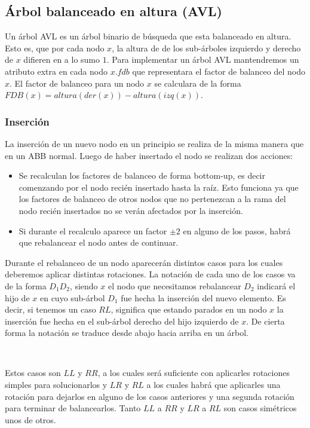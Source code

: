 \documentclass[10pt, a4paper]{report}
\begin{document}
\subsection{\'Arbol balanceado en altura (AVL)}

Un \'arbol AVL es un \'arbol binario de b\'usqueda que esta balanceado en altura. Esto es, que por cada nodo $x$, la altura de de los sub-\'arboles izquierdo y derecho de $x$ difieren en a lo sumo $1$. Para implementar un \'arbol AVL mantendremos un atributo extra en cada nodo $x.fdb$ que representara el factor de balanceo del nodo $x$. El factor de balanceo para un nodo $x$ se calculara de la forma $FDB(x) = altura(der(x)) - altura(izq(x))$.

\subsubsection{Inserci\'on}

La inserci\'on de un nuevo nodo en un principio se realiza de la misma manera que en un ABB normal. Luego de haber insertado el nodo se realizan dos acciones:

\begin{itemize}
 \item Se recalculan los factores de balanceo de forma bottom-up, es decir comenzando por el nodo reci\'en insertado hasta la ra\'iz. Esto funciona ya que los factores de balanceo de otros nodos que no pertenezcan a la rama del nodo reci\'en insertados no se ver\'an afectados por la inserci\'on.
 \item Si durante el recalculo aparece un factor $\pm 2$ en alguno de los pasos, habr\'a que rebalancear el nodo antes de continuar.
\end{itemize}

Durante el rebalanceo de un nodo aparecer\'an distintos casos para los cuales deberemos aplicar distintas rotaciones. La notaci\'on de cada uno de los casos va de la forma $D_1D_2$, siendo $x$ el nodo que necesitamos rebalancear $D_2$ indicar\'a el hijo de $x$ en cuyo sub-\'arbol $D_1$ fue hecha la inserci\'on del nuevo elemento. Es decir, si tenemos un caso $RL$, significa que estando parados en un nodo $x$ la inserci\'on fue hecha en el sub-\'arbol derecho del hijo izquierdo de $x$. De cierta forma la notaci\'on se traduce desde abajo hacia arriba en un \'arbol.

~

Estos casos son $LL$ y $RR$, a los cuales ser\'a suficiente con aplicarles rotaciones simples para solucionarlos y $LR$ y $RL$ a los cuales habr\'a que aplicarles una rotaci\'on para dejarlos en alguno de los casos anteriores y una segunda rotaci\'on para terminar de balancearlos. Tanto $LL$ a $RR$ y $LR$ a $RL$ son casos sim\'etricos unos de otros.
\end{document}
